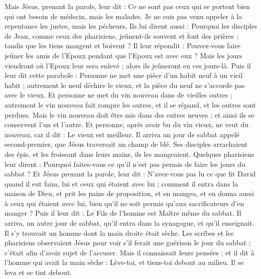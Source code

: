 \begin{multicols}{2}
Mais Jésus, prenant la parole, leur dit : Ce ne sont pas ceux qui se portent bien qui ont besoin de médecin, mais les malades.
Je ne suis pas venu appeler à la repentance les justes, mais les pécheurs.
Ils lui dirent aussi : Pourquoi les disciples de Jean, comme ceux des pharisiens, jeûnent-ils souvent et font des prières ; tandis que les tiens mangent et boivent ?
Il leur répondit : Pouvez-vous faire jeûner les amis de l'Epoux pendant que l'Epoux est avec eux ?
Mais les jours viendront où l'Epoux leur sera enlevé ; alors ils jeûneront en ces jours-là.
Puis il leur dit cette parabole : Personne ne met une pièce d'un habit neuf à un vieil habit ; autrement le neuf déchire le vieux, et la pièce du neuf ne s’accorde pas avec le vieux.
Et personne ne met du vin nouveau dans de vieilles outres ; autrement le vin nouveau fait rompre les outres, et il se répand, et les outres sont perdues.
Mais le vin nouveau doit être mis dans des outres neuves ; et ainsi ils se conservent l'un et l'autre.
Et personne, après avoir bu du vin vieux, ne veut du nouveau, car il dit : Le vieux est meilleur.
\VerseOne{}Il arriva un jour de sabbat appelé second-premier, que Jésus traversait un champ de blé. Ses disciples arrachaient des épis, et les froissant dans leurs mains, ils les mangeaient.
Quelques pharisiens leur dirent : Pourquoi faites-vous ce qu’il n’est pas permis de faire les jours du sabbat ?
Et Jésus prenant la parole, leur dit : N'avez-vous pas lu ce que fit David quand il eut faim, lui et ceux qui étaient avec lui ;
comment il entra dans la maison de Dieu, et prit les pains de proposition, et en mangea, et en donna aussi à ceux qui étaient avec lui, bien qu’il ne soit permis qu'aux sacrificateurs d'en manger ?
Puis il leur dit : Le Fils de l'homme est Maître même du sabbat.
Il arriva, un autre jour de sabbat, qu'il entra dans la synagogue, et qu'il enseignait. Il s’y trouvait un homme dont la main droite était sèche.
Les scribes et les pharisiens observaient Jésus pour voir s’il ferait une guérison le jour du sabbat ; c’était afin d’avoir sujet de l’accuser.
Mais il connaissait leurs pensées ; et il dit à l'homme qui avait la main sèche : Lève-toi, et tiens-toi debout au milieu. Il se leva et se tint debout.

\end{multicols}
